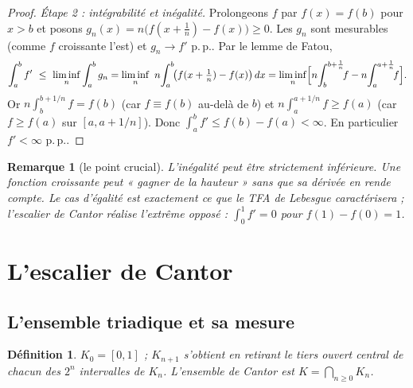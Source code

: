 \documentclass[11pt]{article}
\theoremstyle{thmblue}
\theoremstyle{defplain}
\newtheorem{definition}[theoreme]{Définition}
\theoremstyle{rem}
\newtheorem{remarque}[theoreme]{Remarque}
\newcommand{\dx}{\,dx}
\newcommand{\pp}{p.\,p.}
\begin{document}
\begin{proof}
\emph{Étape 2 : intégrabilité et inégalité.} Prolongeons $f$ par $f(x)=f(b)$ pour $x>b$ et posons
$g_n(x)=n\bigl(f(x+\tfrac1n)-f(x)\bigr)\ge0$. Les $g_n$ sont mesurables (comme $f$ croissante l'est)
et $g_n\to f'$ \pp. Par le lemme de Fatou,
\[
\int_a^b f'\ \le\ \liminf_n\int_a^b g_n
= \liminf_n\ n\!\int_a^b\!\bigl(f(x+\tfrac1n)-f(x)\bigr)\dx
= \liminf_n\Bigl[n\!\int_b^{b+\frac1n}\!\!f - n\!\int_a^{a+\frac1n}\!\!f\Bigr].
\]
Or $n\int_b^{b+1/n}f=f(b)$ (car $f\equiv f(b)$ au-delà de $b$) et
$n\int_a^{a+1/n}f\ge f(a)$ (car $f\ge f(a)$ sur $[a,a+1/n]$). Donc
$\int_a^b f'\le f(b)-f(a)<\infty$. En particulier $f'<\infty$ \pp.
\end{proof}

\begin{remarque}[le point crucial]\label{rem:strict}
L'inégalité peut être \emph{strictement} inférieure. Une fonction croissante peut « gagner de la
hauteur » sans que sa dérivée en rende compte. Le cas d'égalité est exactement ce que le TFA de
Lebesgue caractérisera ; l'escalier de Cantor réalise l'extrême opposé : $\int_0^1 f'=0$ pour
$f(1)-f(0)=1$.
\end{remarque}

\section{L'escalier de Cantor}

\subsection{L'ensemble triadique et sa mesure}

\begin{definition}
$K_0=[0,1]$ ; $K_{n+1}$ s'obtient en retirant le tiers ouvert central de chacun des $2^n$ intervalles
de $K_n$. L'\emph{ensemble de Cantor} est $K=\bigcap_{n\ge0}K_n$.
\end{definition}

\begin{center}
\end{center}
\end{document}
